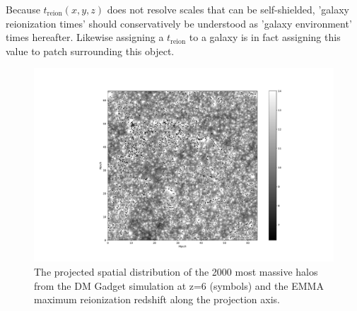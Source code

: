 \documentclass[twocolumn]{aastex61}
\newcommand{\dom}[1]{{#1}}
\begin{document}
Because $t_\mathrm{reion}(x,y,z)$  does not resolve scales that can be self-shielded,  'galaxy reionization times' should conservatively be understood as 'galaxy environment' times hereafter. Likewise assigning a $t_\mathrm{reion}$ to a galaxy is in fact assigning this value to patch surrounding this object.




\begin{figure}[ht]
\begin{center}
\includegraphics[width=2.3 \columnwidth]{img/maphalo.pdf}
\caption{The projected spatial distribution of the 2000 most massive halos from the DM Gadget simulation at z=6 (symbols) and \dom{the EMMA maximum reionization redshift along the projection axis}.}
\end{center}
\label{fig:reion_halo_map}
\end{figure}
\end{document}

